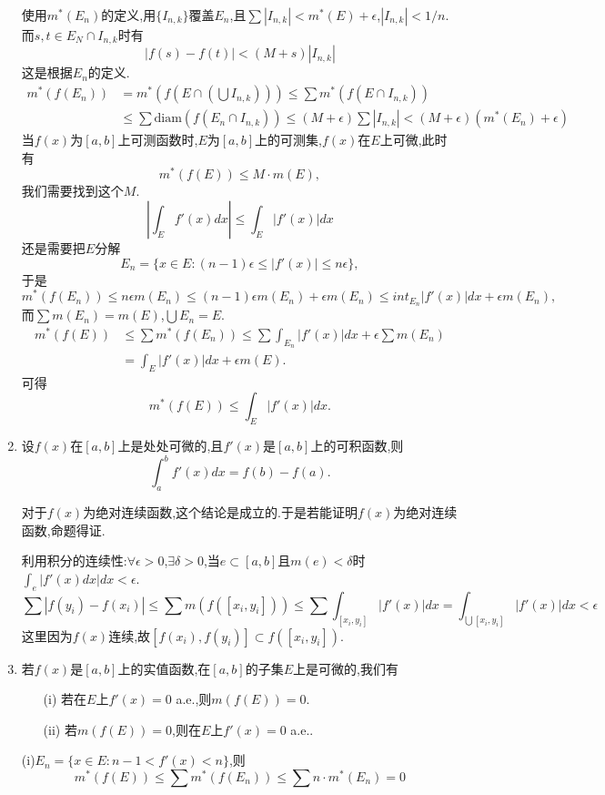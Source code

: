 \documentclass[12pt,a4paper,openany]{book}
\begin{document}
\begin{enumerate}
使用$m^*(E_n)$的定义,用$\{I_{n,k}\}$覆盖$E_n$,且$\sum|I_{n,k}|<m^*(E) + \epsilon$,$|I_{n,k}|<1/n$.而$s,t \in E_N \cap I_{n,k}$时有
\[
|f(s)-f(t)|<(M+s)|I_{n,k}|
\]
这是根据$E_n$的定义.
\[
\begin{aligned}
m^*(f(E_n))&=m^*(f(E \cap (\bigcup{I_{n,k}}))) \le \sum{m^*(f(E \cap I_{n,k}))} \\
&\le \sum\text{diam}(f(E_n \cap I_{n,k})) \le (M+\epsilon)\sum{|I_{n,k}|}<(M+\epsilon)(m^*(E_n)+\epsilon)
\end{aligned}
\]
当$f(x)$为$[a,b]$上可测函数时,$E$为$[a,b]$上的可测集,$f(x)$在$E$上可微,此时有
\[
m^*(f(E)) \le M\cdot m(E),
\]
我们需要找到这个$M$.
\[
|\int_{E}{f'(x)dx}| \le \int_{E}{|f'(x)|dx}
\]
还是需要把$E$分解
\[
E_n = \{x \in E: (n-1)\epsilon \le |f'(x)| \le n\epsilon\},
\]
于是
\[
m^*(f(E_n))\le n\epsilon m(E_n) \le (n-1)\epsilon m(E_n) + \epsilon m(E_n) \le int_{E_n}{|f'(x)|dx} + \epsilon m(E_n),
\]
而$\sum{m(E_n)} = m(E)$,$\bigcup{E_n} =  E$.
\[
\begin{aligned}
m^*(f(E)) &\le \sum{m^*(f(E_n))} \le \sum{\int_{E_n}{|f'(x)|dx}}+\epsilon\sum{m(E_n)}\\
&=\int_{E}{|f'(x)|dx} + \epsilon m(E).
\end{aligned}
\]
可得
\[
m^*(f(E)) \le \int_{E}{|f'(x)|dx}.
\]

\item 设$f(x)$在$[a,b]$上是处处可微的,且$f'(x)$是$[a,b]$上的可积函数,则
\[
\int_{a}^{b}{f'(x)dx}=f(b)-f(a).
\]

对于$f(x)$为绝对连续函数,这个结论是成立的.于是若能证明$f(x)$为绝对连续函数,命题得证.

利用积分的连续性:$\forall \epsilon>0$,$\exists \delta>0$,当$e \subset [a,b]$且$m(e)<\delta$时$\int_{e}{|f'(x)dx|dx}<\epsilon$.
\[
\sum{|f(y_i)-f(x_i)|}\le \sum{m(f([x_i,y_i]))}\le\sum{\int_{[x_i,y_i]}{|f'(x)|dx}}=\int_{\bigcup{[x_i,y_i]}}{|f'(x)|dx}<\epsilon
\]
这里因为$f(x)$连续,故$[f(x_i),f(y_i)] \subset f([x_i,y_i])$.

\item 若$f(x)$是$[a,b]$上的实值函数,在$[a,b]$的子集$E$上是可微的,我们有
\begin{enumerate}
\item[(i)] 若在$E$上$f'(x)=0$ a.e.,则$m(f(E))=0$.
\item[(ii)] 若$m(f(E))=0$,则在$E$上$f'(x)=0$ a.e..
\end{enumerate}

(i)$E_n=\{x \in E: n-1<f'(x)<n\}$,则
\[
m^*(f(E))\le \sum{m^*(f(E_n))}\le\sum{n\cdot m^*(E_n)}=0
\]


\end{enumerate}
\end{document}
